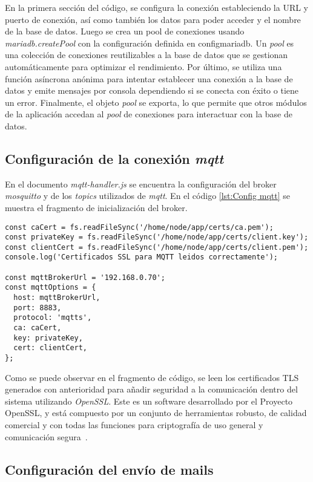 En la primera sección del código, se configura la conexión estableciendo la URL y puerto de conexión, así como también los datos para poder acceder y el nombre de la base de datos. Luego se crea un pool de conexiones usando \textit{mariadb.createPool} con la configuración definida en configmariadb. Un \textit{pool} es una colección de conexiones reutilizables a la base de datos que se gestionan automáticamente para optimizar el rendimiento. Por último, se utiliza una función asíncrona anónima para intentar establecer una conexión a la base de datos y emite mensajes por consola dependiendo si se conecta con éxito o tiene un error. Finalmente, el objeto \textit{pool} se exporta, lo que permite que otros módulos de la aplicación accedan al \textit{pool} de conexiones para interactuar con la base de datos.

\subsection{Configuración de la conexión \textit{mqtt}}

En el documento \textit{mqtt-handler.js} se encuentra la configuración del broker \textit{mosquitto} y de los \textit{topics} utilizados de \textit{mqtt}. En el código \ref{lst:Config mqtt} se muestra el fragmento de inicialización del broker.

\begin{lstlisting}[caption={Inicialización del broker MQTT.}, label={lst:Config mqtt}]
const caCert = fs.readFileSync('/home/node/app/certs/ca.pem');
const privateKey = fs.readFileSync('/home/node/app/certs/client.key');
const clientCert = fs.readFileSync('/home/node/app/certs/client.pem');
console.log('Certificados SSL para MQTT leidos correctamente');

const mqttBrokerUrl = '192.168.0.70';
const mqttOptions = {
  host: mqttBrokerUrl,
  port: 8883,
  protocol: 'mqtts',
  ca: caCert,
  key: privateKey,
  cert: clientCert,
};
\end{lstlisting}

Como se puede observar en el fragmento de código, se leen los certificados TLS generados con anterioridad para añadir seguridad a la comunicación dentro del sistema utilizando \textit{OpenSSL}. Este es un software desarrollado por el Proyecto OpenSSL, y está compuesto por un conjunto de herramientas robusto, de calidad comercial y con todas las funciones para criptografía de uso general y comunicación segura\ \citep{27}.

\subsection{Configuración del envío de mails}


